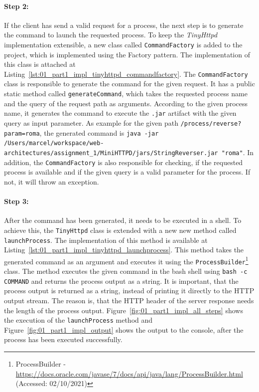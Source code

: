 \documentclass{article}
\def\Fig#1{Figure~\ref{#1}}
\def\Lst#1{Listing~\ref{#1}}
\begin{document}
\paragraph{Step 2:}
If the client has send a valid request for a process, the next step is to generate the command to launch the requested process. To keep the \textit{TinyHttpd} implementation extensible, a new class called \texttt{CommandFactory} is added to the project, which is implemented using the Factory pattern. The implementation of this class is attached at \Lst{lst:01_part1_impl_tinyhttpd_commandfactory}.
The \texttt{CommandFactory} class is responsible to generate the command for the given request. It has a public static method called \texttt{generateCommand}, which takes the requested process name and the query of the request path as arguments.
According to the given process name, it generates the command to execute the \texttt{.jar} artifact with the given query as input parameter.
As example for the given path \texttt{/process/reverse?param=roma}, the generated command is \texttt{java -jar /Users/marcel/workspace/web-architectures/assignment\_1/MiniHTTPD/jars/StringReverser.jar "roma"}. In addition, the \texttt{CommandFactory} is also responsible for checking, if the requested process is available and if the given query is a valid parameter for the process. If not, it will throw an exception.


\paragraph{Step 3:}
After the command has been generated, it needs to be executed in a shell. To achieve this, the \texttt{TinyHttpd} class is extended with a new new method called \texttt{launchProcess}. The implementation of this method is available at \Lst{lst:01_part1_impl_tinyhttpd_launchprocess}. This method takes the generated command as an argument and executes it using the \texttt{ProcessBuilder}\footnote{ProcessBuilder - \url{https://docs.oracle.com/javase/7/docs/api/java/lang/ProcessBuilder.html} (Accessed: 02/10/2021)} class.
The method executes the given command in the bash shell using \texttt{bash -c COMMAND} and returns the process output as a string. It is important, that the process output is returned as a string, instead of printing it directly to the HTTP output stream. The reason is, that the HTTP header of the server response needs the length of the process output.
\Fig{fig:01_part1_impl_all_steps} shows the execution of the \texttt{launchProcess} method and \Fig{fig:01_part1_impl_output} shows the output to the console, after the process has been executed successfully.
\end{document}
